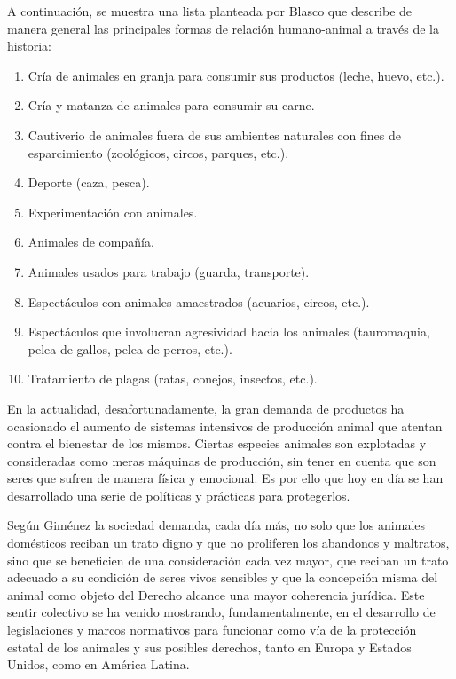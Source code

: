  A continuación, se muestra una lista planteada por Blasco  que describe de manera general las principales formas de relación humano-animal a través de la historia:
\begin{enumerate}
\item Cría de animales en granja para consumir sus productos (leche, huevo, etc.).
\item  Cría y matanza de animales para consumir su carne.
\item  Cautiverio de animales fuera de sus ambientes naturales con fines de esparcimiento (zoológicos, circos, parques, etc.).
\item  Deporte (caza, pesca).
\item  Experimentación con animales.
\item  Animales de compañía.
\item  Animales usados para trabajo (guarda, transporte).
\item  Espectáculos con animales amaestrados (acuarios, circos, etc.).
\item  Espectáculos que involucran agresividad hacia los animales (tauromaquia, pelea de gallos, pelea de perros, etc.).
\item  Tratamiento de plagas (ratas, conejos, insectos, etc.).
\end{enumerate}
En la actualidad, desafortunadamente, la gran demanda de productos ha ocasionado el aumento de sistemas intensivos de producción animal que atentan contra el bienestar de los mismos. Ciertas especies animales son explotadas y consideradas como meras máquinas de producción, sin tener en cuenta que son seres que sufren de manera física y emocional. Es por ello que hoy en día se han desarrollado una serie de políticas y prácticas para protegerlos. 

Según Giménez  la sociedad demanda, cada día más, no solo que los animales domésticos reciban un trato digno y que no proliferen los abandonos y maltratos, sino que se beneficien de una consideración cada vez mayor, que reciban un trato adecuado a su condición de seres vivos sensibles y que la concepción misma del animal como objeto del Derecho alcance una mayor coherencia jurídica. Este sentir colectivo se ha venido mostrando, fundamentalmente, en el desarrollo de legislaciones y marcos normativos para funcionar como vía de la protección estatal de los animales y sus posibles derechos, tanto en Europa y Estados Unidos, como en América Latina.  

